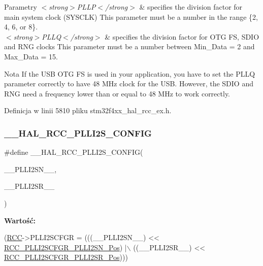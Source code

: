 \begin{DoxyParams}{Parametry}
{\em $<$strong$>$\+P\+L\+L\+P$<$/strong$>$} & specifies the division factor for main system clock (S\+Y\+S\+C\+LK) This parameter must be a number in the range \{2, 4, 6, or 8\}.\\
\hline
{\em $<$strong$>$\+P\+L\+L\+Q$<$/strong$>$} & specifies the division factor for O\+TG FS, S\+D\+IO and R\+NG clocks This parameter must be a number between Min\+\_\+\+Data = 2 and Max\+\_\+\+Data = 15. \\
\hline
\end{DoxyParams}
\begin{DoxyNote}{Nota}
If the U\+SB O\+TG FS is used in your application, you have to set the P\+L\+LQ parameter correctly to have 48 M\+Hz clock for the U\+SB. However, the S\+D\+IO and R\+NG need a frequency lower than or equal to 48 M\+Hz to work correctly. 
\end{DoxyNote}


Definicja w linii 5810 pliku stm32f4xx\+\_\+hal\+\_\+rcc\+\_\+ex.\+h.

\mbox{\label{group___r_c_c_ex___exported___macros_ga5a2fa2687b621f6eda72457d09715298}} 
\subsubsection{\texorpdfstring{\+\_\+\+\_\+\+H\+A\+L\+\_\+\+R\+C\+C\+\_\+\+P\+L\+L\+I2\+S\+\_\+\+C\+O\+N\+F\+IG}{\_\_HAL\_RCC\_PLLI2S\_CONFIG}}
{\footnotesize\ttfamily \#define \+\_\+\+\_\+\+H\+A\+L\+\_\+\+R\+C\+C\+\_\+\+P\+L\+L\+I2\+S\+\_\+\+C\+O\+N\+F\+IG(\begin{DoxyParamCaption}\item[{}]{\+\_\+\+\_\+\+P\+L\+L\+I2\+S\+N\+\_\+\+\_\+,  }\item[{}]{\+\_\+\+\_\+\+P\+L\+L\+I2\+S\+R\+\_\+\+\_\+ }\end{DoxyParamCaption})}

{\bfseries Wartość\+:}
\begin{DoxyCode}
(\hyperlink{group___peripheral__declaration_ga74944438a086975793d26ae48d5882d4}{RCC}->PLLI2SCFGR = (((\_\_PLLI2SN\_\_) << \hyperlink{group___peripheral___registers___bits___definition_gab3cf5415c0debb40f8932d59677103a2}{RCC\_PLLI2SCFGR\_PLLI2SN\_Pos})  |\(\backslash\)
                               ((\_\_PLLI2SR\_\_) << \hyperlink{group___peripheral___registers___bits___definition_ga93e7478c8a17f7d07b937e180f8f13f4}{RCC\_PLLI2SCFGR\_PLLI2SR\_Pos})))
\end{DoxyCode}


